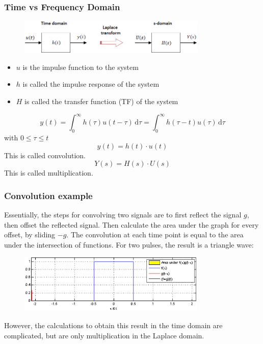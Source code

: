 \documentclass[class=report, crop=false, 12pt,a4paper, tikz, border=4mm]{standalone}
\begin{document}
\subsubsection{Time vs Frequency Domain}
\begin{figure}[H]
  \centering
  \includegraphics[width = 0.8\textwidth]{../img/diagram26.png}
\end{figure}
\begin{itemize}
  \item $u$ is the impulse function to the system
  \item $h$ is called the impulse response of the system
  \item $H$ is called the transfer function (TF) of the system
\end{itemize}
\begin{equation}
  y(t) = \int_{0}^{\infty} h(\tau) u (t-\tau) \,\mathrm{d}\tau = \int_{0}^{\infty} h(\tau - t)u(\tau) \,\mathrm{d}\tau  
\end{equation}
with $0\leq \tau \leq t$
\begin{equation}
  y(t) = h(t) \cdot u(t)
\end{equation}
This is called convolution.
\begin{equation}
  Y(s) = H(s) \cdot U(s)
\end{equation}
This is called multiplication.
\subsubsection{Convolution example}
Essentially, the steps for convolving two signals are to first reflect the signal $g$, then offset the reflected signal. Then calculate the area under the graph for every offset, by sliding $-g$. The convolution at each time point is equal to the area under the intersection of functions. For two pulses, the result is a triangle wave:
\begin{figure}[H]
  \centering
  \includegraphics[width = 0.8\textwidth]{../img/diagram27.png}
\end{figure}
However, the calculations to obtain this result in the time domain are complicated, but are only multiplication in the Laplace domain.
\end{document}

